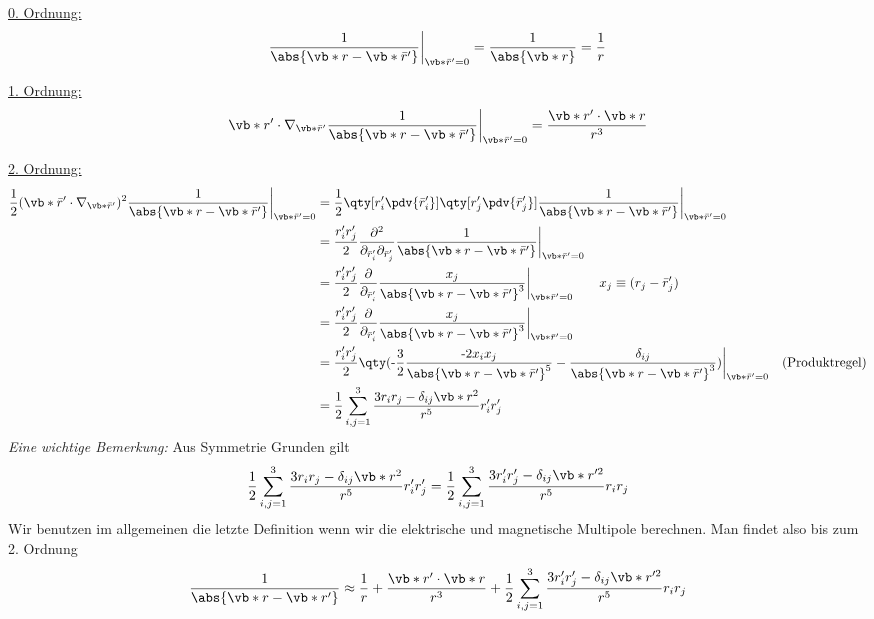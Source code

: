\underline{0. Ordnung:}
\begin{equation*}
  \frac{1}{\abs{\vb*r-\vb*{\bar r'}}}\bigg|_{\vb*{\bar r'}=0} 
  = \frac{1}{\abs{\vb*r}}= \frac{1}{r} 
\end{equation*}

\underline{1. Ordnung:}
\begin{equation*}
  \vb*{r'}\cdot
  \nabla_{\vb*{\bar{r}'}}\frac{1}{\abs{\vb*r-\vb*{\bar{r}'}}}
  \bigg|_{\vb*{\bar r'}=0}
  = \frac{\vb*{ r'}\cdot\vb*r}{r^3} 
\end{equation*}

\underline{2. Ordnung:}
\begin{equation*}
  \begin{split}
  \frac{1}{2}(\vb*{\bar r'}\cdot\nabla_{\vb*{\bar{r}'}})^2
  \frac{1}{\abs{\vb*r-\vb*{\bar r'}}}\bigg|_{\vb*{\bar r'}=0}
  &=
  \frac{1}{2}\qty[r_i'\pdv {\bar r_i'}]\qty[r_j'\pdv{\bar r_j'}]
  \frac{1}{\abs{\vb*r-\vb*{\bar r'}}}
  \bigg|_{\vb*{\bar r'}=0}\\
  &=
  \frac{r'_ir'_j}{2} 
  \frac{\partial^2}{\partial_{\bar r_i'}\partial_{\bar r_j'}} 
  \frac{1}{\abs{\vb*r-\vb*{\bar r'}}}\bigg|_{\vb*{\bar r'}=0}\\
  &=
  \frac{r'_ir'_j}{2} \frac{\partial}{\partial_{\bar r_i'}} 
  \frac{x_j}{\abs{\vb*r-\vb*{\bar r'}}^3}\bigg|_{\vb*{\bar r'}=0}
  \qquad x_j\equiv (r_j-\bar r_j')\\
  &=
  \frac{r'_ir'_j}{2} \frac{\partial}{\partial_{\bar r_i'}} 
  \frac{x_j}{\abs{\vb*r-\vb*{\bar r'}}^3}\bigg|_{\vb*{\bar r'}=0}\\
  &=
  \frac{r'_ir'_j}{2} 
  \qty(
    \text{-}\frac{3}{2}
    \frac{\text{-}2x_i x_j}{\abs{\vb*r-\vb*{\bar r'}}^5}
    -\frac{\delta_{ij}}{\abs{\vb*r-\vb*{\bar r'}}^3} 
  )\bigg|_{\vb*{\bar r'}=0}\quad\text{(Produktregel)}\\
  &=
  \frac{1}{2}\sum_{i,j=1}^3 \frac{3r_ir_j-\delta_{ij}\vb*r^2}{r^5}
  r_i'r_j'
  \end{split}
\end{equation*}
\textit{Eine wichtige Bemerkung:}
Aus Symmetrie Grunden gilt
\begin{equation*}
  \frac{1}{2}\sum_{i,j=1}^3 \frac{3r_ir_j-\delta_{ij}\vb*r^2}{r^5}
  r_i'r_j'
  =
  \frac{1}{2}\sum_{i,j=1}^3 \frac{3r'_ir'_j-\delta_{ij}\vb*r'^2}{r^5}
  r_ir_j
\end{equation*}
Wir benutzen im allgemeinen die letzte Definition wenn wir die
elektrische und magnetische Multipole berechnen. Man findet also bis zum
2. Ordnung
\begin{equation}
  \frac{1}{\abs{\vb*r-\vb*r'}}
  \approx 
  \frac{1}{r} 
  + \frac{\vb*r'\cdot\vb*r}{r^3} 
  + \frac{1}{2}\sum_{i,j=1}^3 
    \frac{3r'_ir'_j-\delta_{ij}\vb*r'^2}{r^5}r_ir_j
\end{equation}
